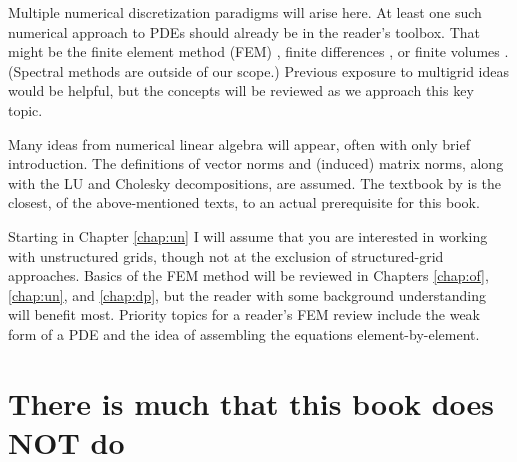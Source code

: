 Multiple numerical discretization paradigms will arise here.  At least one such numerical approach to PDEs should already be in the reader's toolbox.  That might be the finite element method (FEM) \citep{Braess2007,Elmanetal2005,KarniadakisSherwin2013}, finite differences \citep{MortonMayers2005}, or finite volumes \citep{LeVeque2002}.  (Spectral methods \citep{Trefethen2000} are outside of our scope.)  Previous exposure to multigrid ideas \citep{Briggsetal2000} would be helpful, but the concepts will be reviewed as we approach this key topic.

Many ideas from numerical linear algebra \citep{Greenbaum1997,TrefethenBau1997} will appear, often with only brief introduction.  The definitions of vector norms and (induced) matrix norms, along with the LU and Cholesky decompositions, are assumed.  The textbook by \citet{TrefethenBau1997} is the closest, of the above-mentioned texts, to an actual prerequisite for this book.

Starting in Chapter \ref{chap:un} I will assume that you are interested in working with unstructured grids, though not at the exclusion of structured-grid approaches.  Basics of the FEM method will be reviewed in Chapters \ref{chap:of}, \ref{chap:un}, and \ref{chap:dp}, but the reader with some background understanding will benefit most.  Priority topics for a reader's FEM review include the weak form of a PDE and the idea of assembling the equations element-by-element.


\section{There is much that this book does NOT do}

